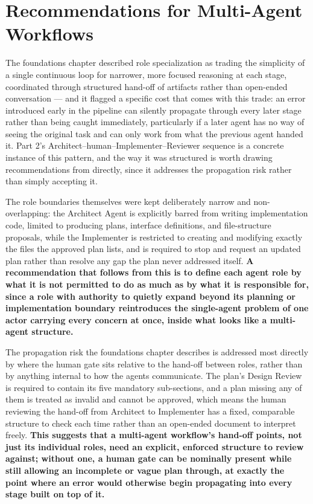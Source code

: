 \section{Recommendations for Multi-Agent Workflows}

The foundations chapter described role specialization as trading the simplicity of a single continuous loop for narrower, more focused reasoning at each stage, coordinated through structured hand-off of artifacts rather than open-ended conversation --- and it flagged a specific cost that comes with this trade: an error introduced early in the pipeline can silently propagate through every later stage rather than being caught immediately, particularly if a later agent has no way of seeing the original task and can only work from what the previous agent handed it. Part 2's Architect--human--Implementer--Reviewer sequence is a concrete instance of this pattern, and the way it was structured is worth drawing recommendations from directly, since it addresses the propagation risk rather than simply accepting it.

The role boundaries themselves were kept deliberately narrow and non-overlapping: the Architect Agent is explicitly barred from writing implementation code, limited to producing plans, interface definitions, and file-structure proposals, while the Implementer is restricted to creating and modifying exactly the files the approved plan lists, and is required to stop and request an updated plan rather than resolve any gap the plan never addressed itself. \textbf{A recommendation that follows from this is to define each agent role by what it is not permitted to do as much as by what it is responsible for, since a role with authority to quietly expand beyond its planning or implementation boundary reintroduces the single-agent problem of one actor carrying every concern at once, inside what looks like a multi-agent structure.}

The propagation risk the foundations chapter describes is addressed most directly by where the human gate sits relative to the hand-off between roles, rather than by anything internal to how the agents communicate. The plan's Design Review is required to contain its five mandatory sub-sections, and a plan missing any of them is treated as invalid and cannot be approved, which means the human reviewing the hand-off from Architect to Implementer has a fixed, comparable structure to check each time rather than an open-ended document to interpret freely. \textbf{This suggests that a multi-agent workflow's hand-off points, not just its individual roles, need an explicit, enforced structure to review against; without one, a human gate can be nominally present while still allowing an incomplete or vague plan through, at exactly the point where an error would otherwise begin propagating into every stage built on top of it.}

